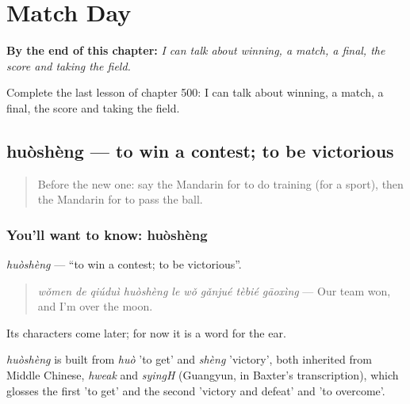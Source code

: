 
\chapter{Match Day}
\label{ch:zh-match-day}

\begin{chapteropening}
\textbf{By the end of this chapter:} \emph{I can talk about winning, a match, a final, the score and taking the field.}

Complete the last lesson of chapter 500: I can talk about winning, a match, a final, the score and taking the field.
\end{chapteropening}

\section[huòshèng]{huòshèng — to win a contest; to be victorious}

\label{lesson:ZH-C500-huosheng}



\begin{quote}
Before the new one: say the Mandarin for to do training (for a sport), then the Mandarin for to pass the ball.
\end{quote}

\subsection*{You'll want to know: huòshèng}
\emph{huòshèng} — \textquotedblleft{}to win a contest; to be victorious\textquotedblright{}.

\begin{quote}
\emph{wǒmen de qiúduì huòshèng le wǒ gǎnjué tèbié gāoxìng} — Our team won, and I'm over the moon.
\end{quote}

Its characters come later; for now it is a word for the ear.

\begin{cousinweb}
\emph{huòshèng} is built from \emph{huò} 'to get' and \emph{shèng} 'victory', both inherited from Middle Chinese, \emph{hweak} and \emph{syingH} (Guangyun, in Baxter's transcription), which glosses the first 'to get' and the second 'victory and defeat' and 'to overcome'.
\end{cousinweb}

